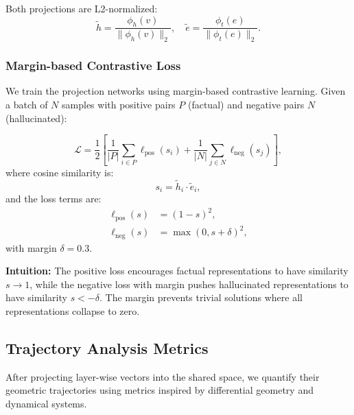 \documentclass[11pt]{article}
\begin{document}
Both projections are L2-normalized:
\begin{equation}
\tilde{h} = \frac{\phi_h(v)}{\|\phi_h(v)\|_2}, \quad
\tilde{e} = \frac{\phi_t(e)}{\|\phi_t(e)\|_2}.
\label{eq:normalize}
\end{equation}

\subsubsection{Margin-based Contrastive Loss}

We train the projection networks using margin-based contrastive learning. Given a batch of $N$ samples with positive pairs $P$ (factual) and negative pairs $N$ (hallucinated):

\begin{equation}
\mathcal{L} = \frac{1}{2} \left[ \frac{1}{|P|} \sum_{i \in P} \ell_{\text{pos}}(s_i) + \frac{1}{|N|} \sum_{j \in N} \ell_{\text{neg}}(s_j) \right],
\label{eq:loss}
\end{equation}
where cosine similarity is:
\begin{equation}
s_i = \tilde{h}_i \cdot \tilde{e}_i,
\end{equation}
and the loss terms are:
\begin{align}
\ell_{\text{pos}}(s) &= (1 - s)^2, \label{eq:loss_pos} \\
\ell_{\text{neg}}(s) &= \max(0, s + \delta)^2, \label{eq:loss_neg}
\end{align}
with margin $\delta = 0.3$.

\textbf{Intuition:} The positive loss encourages factual representations to have similarity $s \to 1$, while the negative loss with margin pushes hallucinated representations to have similarity $s < -\delta$. The margin prevents trivial solutions where all representations collapse to zero.

\subsection{Trajectory Analysis Metrics}
\label{sec:metrics}

After projecting layer-wise vectors into the shared space, we quantify their geometric trajectories using metrics inspired by differential geometry and dynamical systems.
\end{document}
